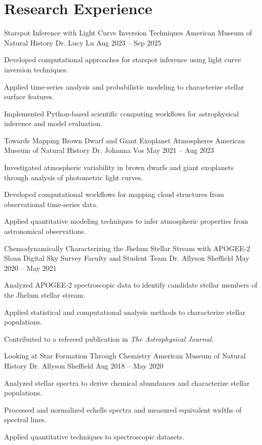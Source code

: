 \section{Research Experience}

\begin{research}
{Starspot Inference with Light Curve Inversion Techniques}
{American Museum of Natural History}
{Dr. Lucy Lu}
{Aug 2023 -- Sep 2025}
    \item Developed computational approaches for starspot inference using light curve inversion techniques.
    \item Applied time-series analysis and probabilistic modeling to characterize stellar surface features.
    \item Implemented Python-based scientific computing workflows for astrophysical inference and model evaluation.
\end{research}

\begin{research}
{Towards Mapping Brown Dwarf and Giant Exoplanet Atmospheres}
{American Museum of Natural History}
{Dr. Johanna Vos}
{May 2021 -- Aug 2023}
    \item Investigated atmospheric variability in brown dwarfs and giant exoplanets through analysis of photometric light curves.
    \item Developed computational workflows for mapping cloud structures from observational time-series data.
    \item Applied quantitative modeling techniques to infer atmospheric properties from astronomical observations.
\end{research}

\begin{research}
{Chemodynamically Characterizing the Jhelum Stellar Stream with APOGEE-2}
{Sloan Digital Sky Survey Faculty and Student Team}
{Dr. Allyson Sheffield}
{May 2020 -- May 2021}
    \item Analyzed APOGEE-2 spectroscopic data to identify candidate stellar members of the Jhelum stellar stream.
    \item Applied statistical and computational analysis methods to characterize stellar populations.
    \item Contributed to a refereed publication in \textit{The Astrophysical Journal}.
\end{research}

\begin{research}
{Looking at Star Formation Through Chemistry}
{American Museum of Natural History}
{Dr. Allyson Sheffield}
{Aug 2018 -- May 2020}
    \item Analyzed stellar spectra to derive chemical abundances and characterize stellar populations.
    \item Processed and normalized echelle spectra and measured equivalent widths of spectral lines.
    \item Applied quantitative techniques to spectroscopic datasets.
\end{research}

